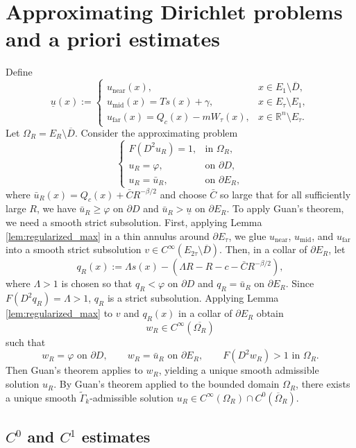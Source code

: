 \documentclass[reqno,a4paper]{amsart}
\numberwithin{equation}{section}
\begin{document}
	
	
	\section{Approximating Dirichlet problems and a priori estimates}
	Define 
	$$	\underline{u}(x) :=
	\begin{cases}
		u_{\text{near}}(x), & x \in E_1 \setminus \overline{D}, \\[6pt]
		u_{\text{mid}}(x) = T s(x) + \gamma, & x \in E_\tau \setminus E_1, \\[6pt]
		u_{\text{far}}(x) = Q_c(x) - m W_\tau(x), & x \in \mathbb{R}^n \setminus E_\tau.
	\end{cases}$$
	Let $\Omega_R = E_R \setminus \overline{D}$. Consider the approximating problem
	\[
	\begin{cases}
		F(D^2 u_R) = 1, & \text{in } \Omega_R, \\
		u_R = \varphi, & \text{on } \partial D, \\
		u_R = \bar{u}_R, & \text{on } \partial E_R,
	\end{cases}
	\]
	where $\bar{u}_R(x) = Q_c(x) + \bar{C} R^{-\beta/2}$ and choose $\bar{C}$  so large that for all sufficiently large $R$, we have $\bar{u}_R \ge \varphi$ on $\partial D$ and 
	$\bar{u}_R > \underline{u}$ on $\partial E_R$.
	To apply Guan's theorem, we need a smooth strict subsolution. 
	First, applying Lemma \ref{lem:regularized_max} in a thin annulus around $\partial E_\tau$, 
	we glue $u_{\mathrm{near}}$, $u_{\mathrm{mid}}$, and $u_{\mathrm{far}}$ into a smooth strict subsolution 
	$v \in C^\infty(E_{2\tau}\setminus\overline{D})$. 
	Then, in a collar of $\partial E_R$, let
	\[
	q_R(x):=\Lambda s(x)-\left(\Lambda R-R-c-\bar{C}R^{-\beta/2}\right),
	\]
	where $\Lambda>1$ is chosen so that $q_R<\varphi$ on $\partial D$ and $q_R=\bar{u}_R$ on $\partial E_R$. 
	Since $F(D^2q_R)=\Lambda>1$, $q_R$ is a strict subsolution. 
	Applying Lemma \ref{lem:regularized_max} to $v$ and $q_R(x)$  in a collar of  $\partial E_R$ obtain 
	\[
	w_R\in C^\infty(\overline{\Omega_R})
	\]
	such that
	\[
	w_R=\varphi \text{ on } \partial D, \qquad w_R=\bar{u}_R \text{ on } \partial E_R, \qquad F(D^2w_R)>1 \text{ in } \Omega_R.
	\]
	Then Guan's theorem applies to $w_R$, yielding a unique smooth admissible solution $u_R$.
	By Guan's theorem \cite{Guan2023} applied to the bounded domain $\Omega_R$, there exists a unique smooth $\widetilde{\Gamma}_k$-admissible solution $u_R \in C^\infty(\Omega_R) \cap C^0(\overline{\Omega}_R)$.
	
	\subsection{\(C^0\) and \(C^1\) estimates}
	
\end{document}
